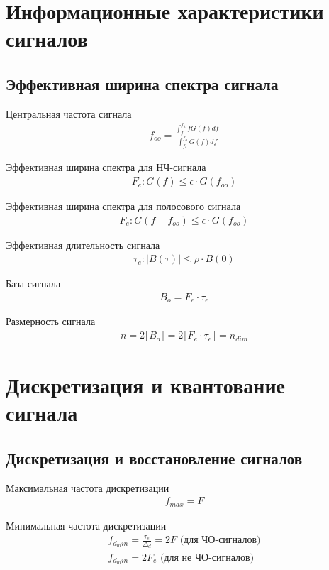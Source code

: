 \chapter{Информационные характеристики сигналов}

\section{Эффективная ширина спектра сигнала}

Центральная частота сигнала
\begin{align}
	f_{oo} = \frac{\int_{f_{l}}^{f_{h}} f G(f) df}{\int_{f_{l}}^{f_{h}} G(f) df}
\end{align}

Эффективная ширина спектра для НЧ-сигнала
\begin{align}
	F_{e}: G(f) \leq \epsilon \cdot G(f_{oo})
\end{align}

Эффективная ширина спектра для полосового сигнала
\begin{align}
	F_{e}: G(f - f_{oo}) \leq \epsilon \cdot G(f_{oo})
\end{align}

Эффективная длительность сигнала
\begin{align}
	\tau_{e}: |B(\tau)| \leq \rho \cdot B(0)
\end{align}

База сигнала
\begin{align}
	B_{o} = F_{e} \cdot \tau_{e}
\end{align}

Размерность сигнала
\begin{align}
	n = 2 \lfloor B_{o} \rfloor = 2 \lfloor F_{e} \cdot \tau_{e} \rfloor = n_{dim}
\end{align}

\chapter{Дискретизация и квантование сигнала}

\section{Дискретизация и восстановление сигналов}

Максимальная частота дискретизации
\begin{align}
	f_{max} = F
\end{align}

Минимальная частота дискретизации
\begin{align}
	f_{d_min} = \frac{\tau_{e}}{\Delta_{d}} = 2F \text{ (для ЧО-сигналов)} \\
	f_{d_min} = 2F_{e} \text{ (для не ЧО-сигналов)}\nonumber
\end{align}
 
